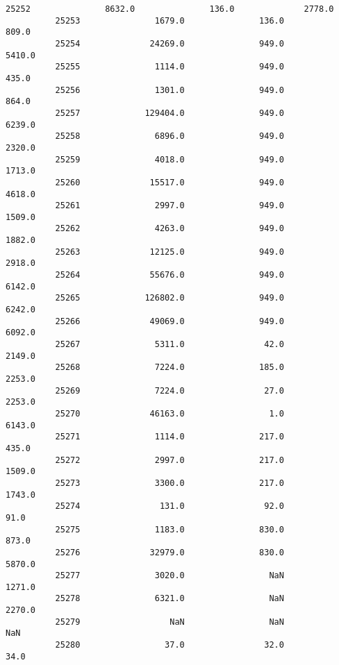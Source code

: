 \documentclass[11pt]{article}
\begin{document}
\begin{Verbatim}[commandchars=\\\{\}]
          25252               8632.0               136.0              2778.0   
          25253               1679.0               136.0               809.0   
          25254              24269.0               949.0              5410.0   
          25255               1114.0               949.0               435.0   
          25256               1301.0               949.0               864.0   
          25257             129404.0               949.0              6239.0   
          25258               6896.0               949.0              2320.0   
          25259               4018.0               949.0              1713.0   
          25260              15517.0               949.0              4618.0   
          25261               2997.0               949.0              1509.0   
          25262               4263.0               949.0              1882.0   
          25263              12125.0               949.0              2918.0   
          25264              55676.0               949.0              6142.0   
          25265             126802.0               949.0              6242.0   
          25266              49069.0               949.0              6092.0   
          25267               5311.0                42.0              2149.0   
          25268               7224.0               185.0              2253.0   
          25269               7224.0                27.0              2253.0   
          25270              46163.0                 1.0              6143.0   
          25271               1114.0               217.0               435.0   
          25272               2997.0               217.0              1509.0   
          25273               3300.0               217.0              1743.0   
          25274                131.0                92.0                91.0   
          25275               1183.0               830.0               873.0   
          25276              32979.0               830.0              5870.0   
          25277               3020.0                 NaN              1271.0   
          25278               6321.0                 NaN              2270.0   
          25279                  NaN                 NaN                 NaN   
          25280                 37.0                32.0                34.0   
          

\end{Verbatim}
\end{document}
